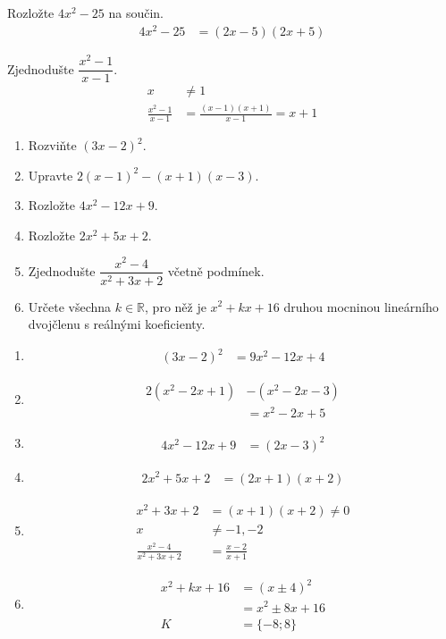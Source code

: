 \documentclass[11pt,a4paper]{article}
\begin{document}
\begin{zadaniReseniBox}[title={Samostatná práce 2}]
Rozložte $4x^2-25$ na součin.
\tcblower
\[
\begin{aligned}
4x^2-25&=(2x-5)(2x+5)
\end{aligned}
\]

\end{zadaniReseniBox}
\begin{zadaniReseniBox}[title={Samostatná práce 3}]
Zjednodušte $\dfrac{x^2-1}{x-1}$.
\tcblower
\[
\begin{aligned}
x&\ne1\\
\frac{x^2-1}{x-1}&=\frac{(x-1)(x+1)}{x-1}=x+1
\end{aligned}
\]

\end{zadaniReseniBox}
\begin{zadaniReseniBox}[title={Domácí úkol}]
\begin{enumerate}[label=\alph*),itemsep=2pt]
\item Rozviňte $(3x-2)^2$.
\item Upravte $2(x-1)^2-(x+1)(x-3)$.
\item Rozložte $4x^2-12x+9$.
\item Rozložte $2x^2+5x+2$.
\item Zjednodušte $\dfrac{x^2-4}{x^2+3x+2}$ včetně podmínek.
\item Určete všechna $k\in\mathbb R$, pro něž je $x^2+kx+16$ druhou mocninou lineárního dvojčlenu s reálnými koeficienty.
\end{enumerate}
\tcblower
\begin{enumerate}[label=\alph*),itemsep=2pt]
\item
\[
\begin{aligned}
(3x-2)^2&=9x^2-12x+4
\end{aligned}
\]
\item
\[
\begin{aligned}
2(x^2-2x+1)&-(x^2-2x-3)\\
&=x^2-2x+5
\end{aligned}
\]
\item
\[
\begin{aligned}
4x^2-12x+9&=(2x-3)^2
\end{aligned}
\]
\item
\[
\begin{aligned}
2x^2+5x+2&=(2x+1)(x+2)
\end{aligned}
\]
\item
\[
\begin{aligned}
x^2+3x+2&=(x+1)(x+2)\ne0\\
x&\ne-1,-2\\
\frac{x^2-4}{x^2+3x+2}&=\frac{x-2}{x+1}
\end{aligned}
\]
\item
\[
\begin{aligned}
x^2+kx+16&=(x\pm4)^2\\
&=x^2\pm8x+16\\
K&=\{-8;8\}
\end{aligned}
\]
\end{enumerate}
\end{zadaniReseniBox}
\end{document}
